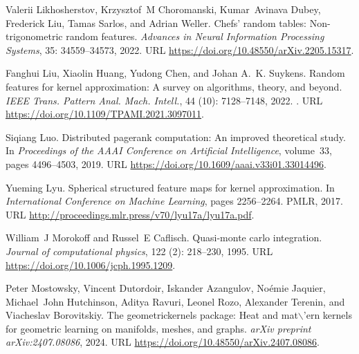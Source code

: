 \begin{thebibliography}{76}
Valerii Likhosherstov, Krzysztof~M Choromanski, Kumar~Avinava Dubey, Frederick Liu, Tamas Sarlos, and Adrian Weller.
\newblock Chefs' random tables: Non-trigonometric random features.
\newblock \emph{Advances in Neural Information Processing Systems}, 35: 34559--34573, 2022.
\newblock URL \url{https://doi.org/10.48550/arXiv.2205.15317}.

Fanghui Liu, Xiaolin Huang, Yudong Chen, and Johan A.~K. Suykens.
\newblock Random features for kernel approximation: {A} survey on algorithms, theory, and beyond.
\newblock \emph{{IEEE} Trans. Pattern Anal. Mach. Intell.}, 44 (10): 7128--7148, 2022.
\newblock {}.
\newblock URL \url{https://doi.org/10.1109/TPAMI.2021.3097011}.

Siqiang Luo.
\newblock Distributed pagerank computation: An improved theoretical study.
\newblock In \emph{Proceedings of the AAAI Conference on Artificial Intelligence}, volume~33, pages 4496--4503, 2019.
\newblock URL \url{https://doi.org/10.1609/aaai.v33i01.33014496}.

Yueming Lyu.
\newblock Spherical structured feature maps for kernel approximation.
\newblock In \emph{International Conference on Machine Learning}, pages 2256--2264. PMLR, 2017.
\newblock URL \url{http://proceedings.mlr.press/v70/lyu17a/lyu17a.pdf}.

William~J Morokoff and Russel~E Caflisch.
\newblock Quasi-monte carlo integration.
\newblock \emph{Journal of computational physics}, 122 (2): 218--230, 1995.
\newblock URL \url{https://doi.org/10.1006/jcph.1995.1209}.

Peter Mostowsky, Vincent Dutordoir, Iskander Azangulov, No{\'e}mie Jaquier, Michael~John Hutchinson, Aditya Ravuri, Leonel Rozo, Alexander Terenin, and Viacheslav Borovitskiy.
\newblock The geometrickernels package: Heat and mat$\backslash$'ern kernels for geometric learning on manifolds, meshes, and graphs.
\newblock \emph{arXiv preprint arXiv:2407.08086}, 2024.
\newblock URL \url{https://doi.org/10.48550/arXiv.2407.08086}.


\end{thebibliography}
